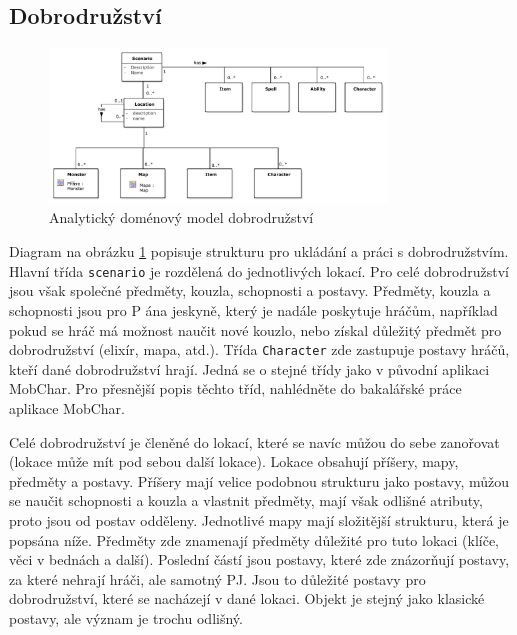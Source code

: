 \documentclass[thesis=B,czech]{resources/FITthesis}[2012/06/26]
\begin{document}
\subsection{Dobrodružství}
\begin{figure}\centering
	\includegraphics[width=0.8\textwidth]{images/domain_scenario}
	\caption[Analytický doménový model dobrodružství]{Analytický doménový model dobrodružství}\label{fig:dm_scenario}
\end{figure}
Diagram na obrázku \ref{fig:dm_scenario} popisuje strukturu pro ukládání a práci s dobrodružstvím. Hlavní třída \texttt{scenario} je rozdělená do jednotlivých lokací. Pro celé dobrodružství jsou však společné předměty, kouzla, schopnosti a postavy. Předměty, kouzla a schopnosti jsou pro P	ána jeskyně, který je nadále poskytuje hráčům, například pokud se hráč má možnost naučit nové kouzlo, nebo získal důležitý předmět pro dobrodružství (elixír, mapa, atd.). Třída \texttt{Character} zde zastupuje postavy hráčů, kteří dané dobrodružství hrají. Jedná se o stejné třídy jako v původní aplikaci MobChar. Pro přesnější popis těchto tříd, nahlédněte do bakalářské práce aplikace MobChar\cite{Weberova_2017}.\par

Celé dobrodružství je členěné do lokací, které se navíc můžou do sebe zanořovat (lokace může mít pod sebou další lokace). Lokace obsahují příšery, mapy, předměty a postavy. Příšery mají velice podobnou strukturu jako postavy, můžou se naučit schopnosti a kouzla a vlastnit předměty, mají však odlišné atributy, proto jsou od postav odděleny. Jednotlivé mapy mají složitější strukturu, která je popsána níže. Předměty zde znamenají předměty důležité pro tuto lokaci (klíče, věci v bednách a další). Poslední částí jsou postavy, které zde znázorňují postavy, za které nehrají hráči, ale samotný PJ. Jsou to důležité postavy pro dobrodružství, které se nacházejí v dané lokaci. Objekt je stejný jako klasické postavy, ale význam je trochu odlišný.
\end{document}
